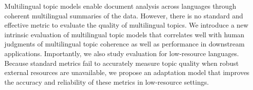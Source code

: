 Multilingual topic models enable document analysis across languages through coherent multilingual summaries of the data. However, there is no standard and effective metric to evaluate the quality of multilingual topics. We introduce a new intrinsic evaluation of multilingual topic models that correlates well with human judgments of multilingual topic coherence as well as performance in downstream applications. Importantly, we also study evaluation for low-resource languages. Because standard metrics fail to accurately measure topic quality when robust external resources are unavailable, we propose an adaptation model that improves the accuracy and reliability of these metrics in low-resource settings.
